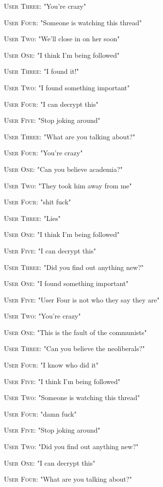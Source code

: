 \documentclass{report}
\begin{document}
\textsc{User Three}: "You're crazy" 

\textsc{User Four}: "Someone is watching this thread" 

\textsc{User Two}: "We'll close in on her soon" 

\textsc{User One}: "I think I'm being followed" 

\textsc{User Three}: "I found it!" 

\textsc{User Two}: "I found something important" 

\textsc{User Four}: "I can decrypt this" 

\textsc{User Five}: "Stop joking around" 

\textsc{User Three}: "What are you talking about?" 

\textsc{User Four}: "You're crazy" 

\textsc{User One}: "Can you believe academia?" 

\textsc{User Two}: "They took him away from me" 

\textsc{User Four}: "shit fuck" 

\textsc{User Three}: "Lies" 

\textsc{User One}: "I think I'm being followed" 

\textsc{User Five}: "I can decrypt this" 

\textsc{User Three}: "Did you find out anything new?" 

\textsc{User One}: "I found something important" 

\textsc{User Five}: "User Four is not who they say they are" 

\textsc{User Two}: "You're crazy" 

\textsc{User One}: "This is the fault of the communists" 

\textsc{User Three}: "Can you believe the neoliberals?" 

\textsc{User Four}: "I know who did it" 

\textsc{User Five}: "I think I'm being followed" 

\textsc{User Two}: "Someone is watching this thread" 

\textsc{User Four}: "damn fuck" 

\textsc{User Five}: "Stop joking around" 

\textsc{User Two}: "Did you find out anything new?" 

\textsc{User One}: "I can decrypt this" 

\textsc{User Four}: "What are you talking about?" 
\end{document}
